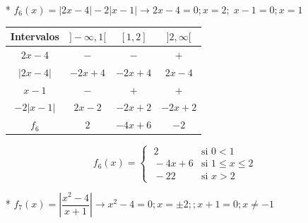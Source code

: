 {\begin{proofw}
\begin{itemize}
\begin{multicols}{2}
				\begin{equation*}
					f_3(x)=
					\begin{cases} 
					\;  -4 x &\mbox{si } x<1 \\ 
					\; 2x+2 &\mbox{si } -Âº\le x \le 3 \\
					\;    4   & \mbox{si } x>3
					\end{cases}
				\end{equation*}
				
			\end{multicols}
			
		\item[*] $f_6(x)=|2x-4|-2|x-1| \to 2x-4=0; x=2; \; x-1=0; x=1$ 
		
			\begin{multicols}{2} 
			
				\begin{table}[H]
					\centering
					\begin{tabular}{|c|c|c|c|}
					\hline
					Intervalos & $]-\infty, 1[$ & $[1,2]$ & $]2, \infty[$ \\ \hline
					$2x-4$ & $-$ &  $-$ & $+$ \\ \hline	
					  $|2x-4|$ & $-2x+4$  & $-2x+4$  & $2x-4$     \\ \hline
					 $x-1$  & $-$  & $+$  & $+$   \\ \hline
					 $-2|x-1|$  & $2x-2$  & $-2x+2$  & $-2x+2$   \\ \hline
					 $f_6$  & $2$  & $-4x+6$  & $-2$   \\ \hline 
					\end{tabular}
				\end{table}
			
				\begin{equation*}
					f_6(x)=
					\begin{cases} 
					\;  2 &\mbox{si } 0<1 \\ 
					\; -4x+6 &\mbox{si } 1\le x \le 2 \\ 
					\; -2 2 &\mbox{si } x>2
					\end{cases}
				\end{equation*}
				
			\end{multicols}
		
		\item[*] $f_7(x)=\left| \dfrac {x^2-4}{x+1} \right| \to x^2-4=0; x=\pm 2; ; x+1=0; x\neq -1$ 
		
			
			    

\end{itemize}
\end{proofw}}
